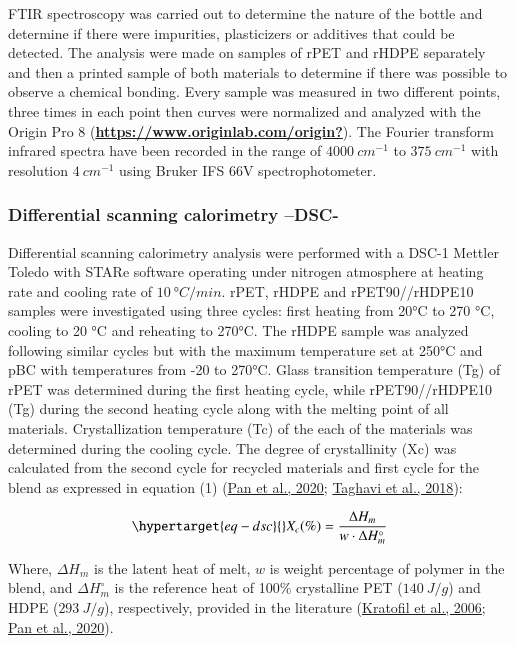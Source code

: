 \documentclass[
  12pt,
  number,
  review]{elsarticle}
\begin{document}
FTIR spectroscopy was carried out to determine the nature of the bottle
and determine if there were impurities, plasticizers or additives that
could be detected. The analysis were made on samples of rPET and rHDPE
separately and then a printed sample of both materials to determine if
there was possible to observe a chemical bonding. Every sample was
measured in two different points, three times in each point then curves
were normalized and analyzed with the Origin Pro 8
(\protect\hyperlink{ref-https:ux2fux2fwww.originlab.comux2forigin}{\textbf{https://www.originlab.com/origin?}}).
The Fourier transform infrared spectra have been recorded in the range
of \(4000~cm^{-1}\) to \(375~cm^{-1}\) with resolution \(4~cm^{-1}\)
using Bruker IFS 66V spectrophotometer.

\hypertarget{differential-scanning-calorimetry-dsc-}{%
\subsubsection{Differential scanning calorimetry
--DSC-}\label{differential-scanning-calorimetry-dsc-}}

Differential scanning calorimetry analysis were performed with a DSC-1
Mettler Toledo with STARe software operating under nitrogen atmosphere
at heating rate and cooling rate of \(10~°C/min\). rPET, rHDPE and
rPET90//rHDPE10 samples were investigated using three cycles: first
heating from 20°C to 270 °C, cooling to 20 °C and reheating to 270°C.
The rHDPE sample was analyzed following similar cycles but with the
maximum temperature set at 250°C and pBC with temperatures from -20 to
270°C. Glass transition temperature (Tg) of rPET was determined during
the first heating cycle, while rPET90//rHDPE10 (Tg) during the second
heating cycle along with the melting point of all materials.
Crystallization temperature (Tc) of the each of the materials was
determined during the cooling cycle. The degree of crystallinity (Xc)
was calculated from the second cycle for recycled materials and first
cycle for the blend as expressed in equation (1)
(\protect\hyperlink{ref-pan2020}{Pan et al., 2020};
\protect\hyperlink{ref-taghavi2018}{Taghavi et al., 2018}):

\begin{equation}\protect\hypertarget{eq-dsc}{}{
X_{c}(\%) = \frac{\Delta H_{m}}{w \cdot \Delta H_{m}^\circ}
}\label{eq-dsc}\end{equation}

Where, \(\Delta H_{m}\) is the latent heat of melt, \(w\) is weight
percentage of polymer in the blend, and \(\Delta H_{m}^\circ\) is the
reference heat of 100\% crystalline PET (\(140~J/g\)) and HDPE
(\(293~J/g\)), respectively, provided in the literature
(\protect\hyperlink{ref-kratofil2006}{Kratofil et al., 2006};
\protect\hyperlink{ref-pan2020}{Pan et al., 2020}).
\end{document}
